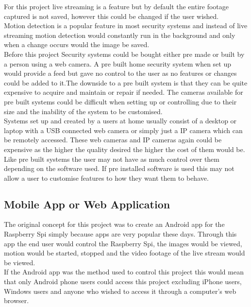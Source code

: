\documentclass[12pt]{report}
\begin{document}
For this project live streaming is a feature but by default the entire footage captured is not saved, however this could be changed if the user wished.\\

Motion detection is a popular feature in most security systems and instead of live streaming motion detection would constantly run in the background and only when a change occurs would the image be saved. \\

Before this project Security systems could be bought either pre made or built by a person using a web camera. A pre built home security system when set up would provide a feed but gave no control to the user as no features or changes could be added to it.The downside to a pre built system is that they can be quite expensive to acquire and maintain or repair if needed. The cameras available for pre built systems could be difficult when setting up or controlling due to their size and the inability of the system to be customised.\\

Systems set up and created by a users at home usually consist of a desktop or laptop with a USB connected web camera or simply just a IP camera which can be remotely accessed. These web cameras and IP cameras again could be expensive as the higher the quality desired the higher the cost of them would be. Like pre built systems the user may not have as much control over them depending on the software used. If pre installed software is used this may not allow a user to customise features to how they want them to behave.\\ 

\subsection{Mobile App or Web Application}
\label{subsec:Android}
The original concept for this project was to create an Android app for the Raspberry Spi simply because apps are very popular these days. Through this app the end user would control the Raspberry Spi, the images would be viewed, motion would be started, stopped and the video footage of the live stream would be viewed.\\

If the Android app was the method used to control this project this would mean that only Android phone users could access this project excluding iPhone users, Windows users and anyone who wished to access it through a computer's web browser.\\
\end{document}
